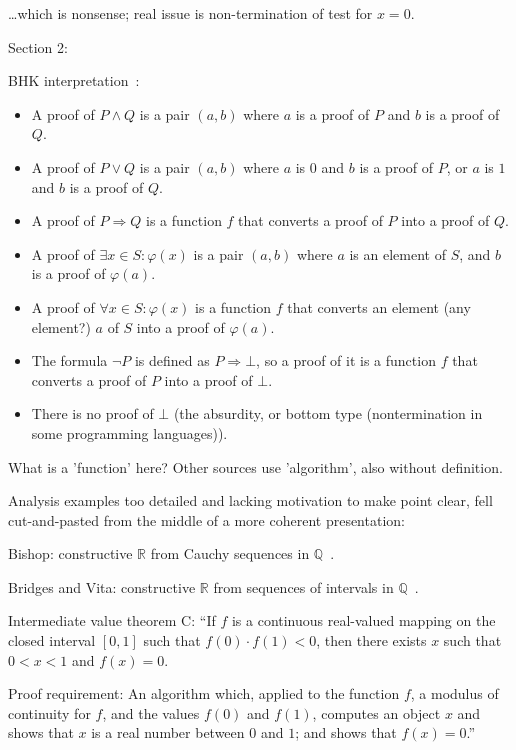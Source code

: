 \ldots which is nonsense;
real issue is non-termination of test for $x=0$.

Section 2:

BHK interpretation~\cite{wiki:Brouwer_Heyting_Kolmogorov_interpretation}:
\begin{itemize}
  \item A proof of $P\wedge Q$ 
  is a pair $(a,b)$ where $a$ is a proof of $P$ 
  and $b$ is a proof of $Q$.
\item A proof of $P\vee Q$ is a pair $(a,b)$ 
where $a$ is $0$ and 
$b$ is a proof of $P$, 
or $a$ is $1$ 
and $b$ is a proof of $Q$.
\item A proof of $P\Rightarrow Q$ is 
a function $f$ that converts 
a proof of $P$ into a proof of $Q$.
\item A proof of $\exists x\in S:\varphi (x)$ is 
a pair $(a,b)$ where 
$a$ is an element of $S$, 
and $b$ is a proof of $\varphi (a)$.
\item A proof of $\forall x\in S:\varphi (x)$ is 
a function $f$ that converts 
an element (any element?) $a$ of $S$ into a proof of $\varphi (a)$.
\item The formula $\neg P$ is defined as $P\Rightarrow \bot$, 
so a proof of it is a function $f$ that converts 
a proof of $P$ into a proof of $\bot$.
\item There is no proof of $\bot$
(the absurdity, or bottom type 
(nontermination in some programming languages)).
\end{itemize}
What is a 'function' here? 
Other sources use 'algorithm', also without definition.

Analysis examples too detailed and lacking motivation 
to make point clear, fell cut-and-pasted from the middle
of a more coherent presentation:

Bishop: constructive $\mathbb{R}$ 
from Cauchy sequences 
in $\mathbb{Q}$~\cite{bishop1985constructive}.

Bridges and Vita: constructive $\mathbb{R}$ from sequences
of intervals in $\mathbb{Q}$~\cite{Bridger:2019}.

Intermediate value theorem C: 
``If $f$ is a continuous real-valued mapping 
on the closed interval $[0,1]$ such that $f(0)⋅f(1)<0$, 
then there exists $x$ such that $0<x<1$ and $f(x)=0$.

Proof requirement: 
An algorithm which, applied to the function $f$, 
a modulus of continuity for $f$, and the values $f(0)$ and $f(1)$,
computes an object $x$ and shows that $x$ is a real number 
between $0$ and $1$; and
shows that $f(x)=0$.''~\cite{sep:mathematics_constructive}

